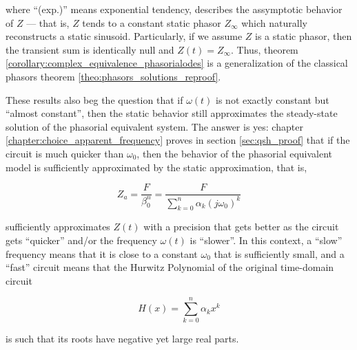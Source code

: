 	\noindent where ``(exp.)'' means exponential tendency, describes the assymptotic behavior of $Z$ — that is, $Z$ tends to a constant static phasor $Z_\infty$ which naturally reconstructs a static sinusoid. Particularly, if we assume $Z$ is a static phasor, then the transient sum is identically null and $Z(t) = Z_\infty$. Thus, theorem \ref{corollary:complex_equivalence_phasorialodes} is a generalization of the classical phasors theorem \ref{theo:phasors_solutions_reproof}.

	These results also beg the question that if $\omega(t)$ is not exactly constant but ``almost constant'', then the static behavior still approximates the steady-state solution of the phasorial equivalent system. The answer is yes: chapter \ref{chapter:choice_apparent_frequency} proves in section \ref{sec:qsh_proof} that if the circuit is much quicker than $\omega_0$, then the behavior of the phasorial equivalent model is sufficiently approximated by the static approximation, that is,

\begin{equation} Z_a = \dfrac{F}{\beta_0^n} = \dfrac{F}{\sum\limits_{k=0}^{n} \alpha_k \left(j\omega_0\right)^{k}} \end{equation}

	\noindent sufficiently approximates $Z(t)$ with a precision that gets better as the circuit gets ``quicker'' and/or the frequency $\omega(t)$ is ``slower''. In this context, a ``slow'' frequency means that it is close to a constant $\omega_0$ that is sufficiently small, and a ``fast'' circuit means that the Hurwitz Polynomial of the original time-domain circuit

\begin{equation} H(x) = \sum\limits_{k=0}^n \alpha_k x^k \end{equation}

	\noindent is such that its roots have negative yet large real parts.	

